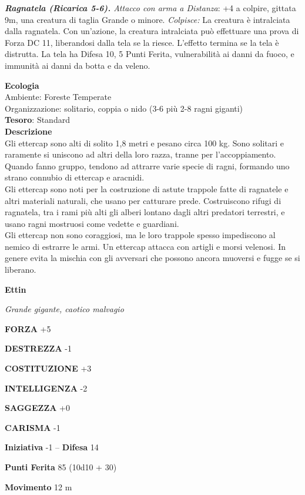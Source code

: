 \begin{multicols}{2}
\textit{\textbf{Ragnatela (Ricarica 5-6).} Attacco con arma a Distanza}: +4 a colpire, gittata 9m, una creatura di taglia Grande o minore. \textit{Colpisce:} La creatura è intralciata dalla ragnatela. Con un'azione, la creatura intralciata può effettuare una prova di Forza DC 11, liberandosi dalla tela se la riesce. L'effetto termina se la tela è distrutta. La tela ha Difesa 10, 5 Punti Ferita, vulnerabilità ai danni da fuoco, e immunità ai danni da botta e da veleno.

\textbf{Ecologia}\\
Ambiente: Foreste Temperate\\
Organizzazione: solitario, coppia o nido (3-6 più 2-8 ragni giganti)\\
\textbf{Tesoro}: Standard\\
\textbf{Descrizione}\\
Gli ettercap sono alti di solito 1,8 metri e pesano circa 100 kg. Sono solitari e raramente si uniscono ad altri della loro razza, tranne per l'accoppiamento. Quando fanno gruppo, tendono ad attrarre varie specie di ragni, formando uno strano connubio di ettercap e aracnidi.\\
Gli ettercap sono noti per la costruzione di astute trappole fatte di ragnatele e altri materiali naturali, che usano per catturare prede. Costruiscono rifugi di ragnatela, tra i rami più alti gli alberi lontano dagli altri predatori terrestri, e usano ragni mostruosi come vedette e guardiani.\\
Gli ettercap non sono coraggiosi, ma le loro trappole spesso impediscono al nemico di estrarre le armi. Un ettercap attacca con artigli e morsi velenosi. In genere evita la mischia con gli avversari che possono ancora muoversi e fugge se si liberano.


\medskip{}\textbf{Ettin}

\textit{Grande gigante, caotico malvagio}

\textbf{FORZA} +5

\textbf{DESTREZZA} -1

\textbf{COSTITUZIONE} +3

\textbf{INTELLIGENZA} -2

\textbf{SAGGEZZA} +0

\textbf{CARISMA} -1

\textbf{Iniziativa} -1 -- \textbf{Difesa} 14

\textbf{Punti Ferita} 85 (10d10 + 30)

\textbf{Movimento} 12 m


\end{multicols}
